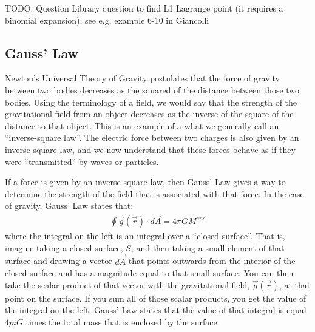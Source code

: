 TODO: Question Library question to find L1 Lagrange point (it requires a binomial expansion), see e.g. example 6-10 in Giancolli


\subsection{Gauss' Law}
Newton's Universal Theory of Gravity postulates that the force of gravity between two bodies decreases as the squared of the distance between those two bodies. Using the terminology of a field, we would say that the strength of the gravitational field from an object decreases as the inverse of the square of the distance to that object. This is an example of a what we generally call an ``inverse-square law''. The electric force between two charges is also given by an inverse-square law, and we now understand that these forces behave as if they were ``transmitted'' by waves or particles.

If a force is given by an inverse-square law, then Gauss' Law gives a way to determine the strength of the field that is associated with that force. In the case of gravity, Gauss' Law states that:
\begin{align*}
\oint \vec g(\vec r) \cdot d\vec A = 4\pi G M^{enc}
\end{align*}
where the integral on the left is an integral over a ``closed surface''. That is, imagine taking a closed surface, $S$, and then taking a small element of that surface and drawing a vector $d\vec A$ that points outwards from the interior of the closed surface and has a magnitude equal to that small surface. You can then take the scalar product of that vector with the gravitational field, $\vec g(\vec r)$, at that point on the surface. If you sum all of those scalar products, you get the value of the integral on the left. Gauss' Law states that the value of that integral is equal $4 pi G$ times the total mass that is enclosed by the surface. 

